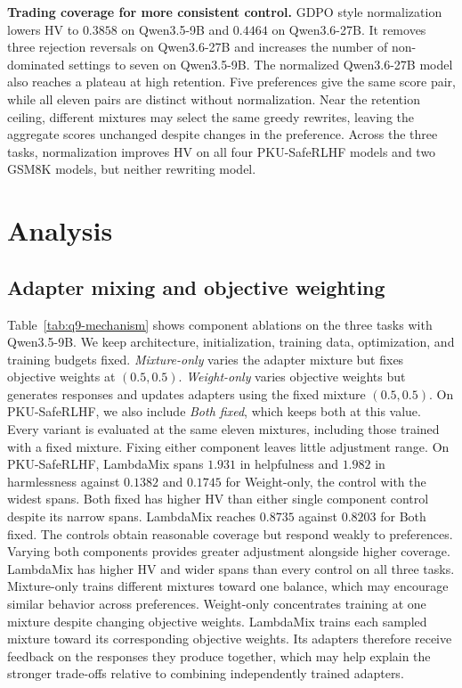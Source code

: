 \documentclass{article} %
\begin{document}
\textbf{Trading coverage for more consistent control.} GDPO style normalization lowers HV to $0.3858$ on Qwen3.5-9B and $0.4464$ on Qwen3.6-27B. It removes three rejection reversals on Qwen3.6-27B and increases the number of non-dominated settings to seven on Qwen3.5-9B. The normalized Qwen3.6-27B model also reaches a plateau at high retention. Five preferences give the same score pair, while all eleven pairs are distinct without normalization. Near the retention ceiling, different mixtures may select the same greedy rewrites, leaving the aggregate scores unchanged despite changes in the preference. Across the three tasks, normalization improves HV on all four PKU-SafeRLHF models and two GSM8K models, but neither rewriting model.




\section{Analysis}

\subsection{Adapter mixing and objective weighting}



Table~\ref{tab:q9-mechanism} shows component ablations on the three tasks with Qwen3.5-9B. We keep architecture, initialization, training data, optimization, and training budgets fixed. \textit{Mixture-only} varies the adapter mixture but fixes objective weights at $(0.5,0.5)$. \textit{Weight-only} varies objective weights but generates responses and updates adapters using the fixed mixture $(0.5,0.5)$. On PKU-SafeRLHF, we also include \textit{Both fixed}, which keeps both at this value. Every variant is evaluated at the same eleven mixtures, including those trained with a fixed mixture. Fixing either component leaves little adjustment range. On PKU-SafeRLHF, LambdaMix spans $1.931$ in helpfulness and $1.982$ in harmlessness against $0.1382$ and $0.1745$ for Weight-only, the control with the widest spans. Both fixed has higher HV than either single component control despite its narrow spans. LambdaMix reaches $0.8735$ against $0.8203$ for Both fixed. The controls obtain reasonable coverage but respond weakly to preferences. Varying both components provides greater adjustment alongside higher coverage. LambdaMix has higher HV and wider spans than every control on all three tasks. Mixture-only trains different mixtures toward one balance, which may encourage similar behavior across preferences. Weight-only concentrates training at one mixture despite changing objective weights. LambdaMix trains each sampled mixture toward its corresponding objective weights. Its adapters therefore receive feedback on the responses they produce together, which may help explain the stronger trade-offs relative to combining independently trained adapters.
\end{document}
